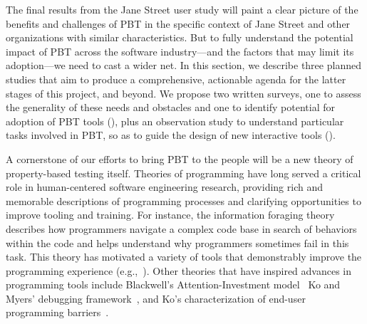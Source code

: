 
\iflater{}\fi


\iflater{}\fi

The final results from the Jane Street user study\iflater{}\fi{} will
paint a clear
picture of the benefits and challenges of PBT in the specific context
of Jane Street and other organizations with similar characteristics.  But to
fully understand the potential impact of PBT across the software
industry---and the factors that may limit its adoption---we need to
cast a wider net.
%
In this section, we describe three planned studies that aim
to produce a comprehensive, actionable
agenda for the latter stages of this project, and beyond.  We propose two
written surveys, one to assess the generality of these needs and obstacles
and one to identify potential for adoption of PBT tools
(), plus an observation study to understand
particular tasks involved in PBT, so as to guide the design of new
interactive tools
().

%
A cornerstone of our efforts to bring PBT to the people 
will be a new theory of property-based testing itself.  Theories of
programming have 
long served a critical role in human-centered software engineering
research, providing rich and memorable descriptions of programming
processes and clarifying opportunities to improve tooling and training.
For instance, the information foraging theory~\cite{ref:lawrance2010programmers}
describes how programmers navigate a complex code base in search of behaviors
within the code and helps understand why programmers sometimes fail
in this task. This
theory has motivated a variety of tools that demonstrably improve the
programming experience (e.g.,~\cite{ref:henley2014patchworks}).  Other theories
that have inspired advances in programming tools include
Blackwell's Attention-Investment model~\cite{ref:blackwell2002first} Ko and
Myers' debugging framework~\cite{ref:ko2005framework}, and Ko's characterization
of end-user programming barriers~\cite{ref:ko2004six}.

